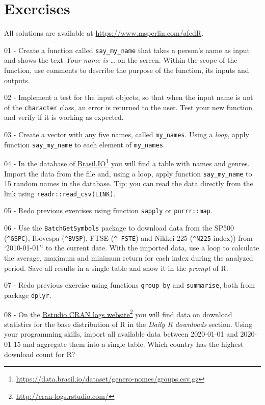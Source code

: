 \documentclass[
  12pt,
]{book}
\begin{document}
\hypertarget{exercises-6}{%
\section{Exercises}\label{exercises-6}}

All solutions are available at \url{https://www.msperlin.com/afedR}.

01 -
Create a function called \texttt{say\_my\_name} that takes a person's name as input and shows the text \emph{Your name is \ldots{}} on the screen. Within the scope of the function, use comments to describe the purpose of the function, its inputs and outputs.

02 -
Implement a test for the input objects, so that when the input name is not of the \texttt{character} class, an error is returned to the user. Test your new function and verify if it is working as expected.

03 -
Create a vector with any five names, called \texttt{my\_names}. Using a \emph{loop}, apply function \texttt{say\_my\_name} to each element of \texttt{my\_names}.

04 -
In the database of \href{https://data.brasil.io/dataset/genero-nomes/groups.csv.gz}{Brasil.IO}\footnote{\url{https://data.brasil.io/dataset/genero-nomes/groups.csv.gz}} you will find a table with names and genres. Import the data from the file and, using a loop, apply function \texttt{say\_my\_name} to 15 random names in the database. Tip: you can read the data directly from the link using \texttt{readr::read\_csv(LINK)}.

05 -
Redo previous exercises using function \texttt{sapply} or \texttt{purrr::map}.

06 -
Use the \texttt{BatchGetSymbols} package to download data from the SP500 (\texttt{\textquotesingle{}\^{}GSPC\textquotesingle{}}), Ibovespa (\texttt{\textquotesingle{}\^{}BVSP\textquotesingle{}}), FTSE (\texttt{\textquotesingle{}\^{}\ FSTE\textquotesingle{}}) and Nikkei 225 (\texttt{\textquotesingle{}\^{}N225\textquotesingle{}} index)) from `2010-01-01'` to the current date. With the imported data, use a loop to calculate the average, maximum and minimum return for each index during the analyzed period. Save all results in a single table and show it in the \emph{prompt} of R.

07 -
Redo previous exercise using functions \texttt{group\_by} and \texttt{summarise}, both from package \texttt{dplyr}.

08 -
On the \href{http://cran-logs.rstudio.com/}{Rstudio CRAN logs website}\footnote{\url{http://cran-logs.rstudio.com/}} you will find data on download statistics for the base distribution of R in the \emph{Daily R downloads} section. Using your programming skills, import all available data between 2020-01-01 and 2020-01-15 and aggregate them into a single table. Which country has the highest download count for R?
\end{document}
